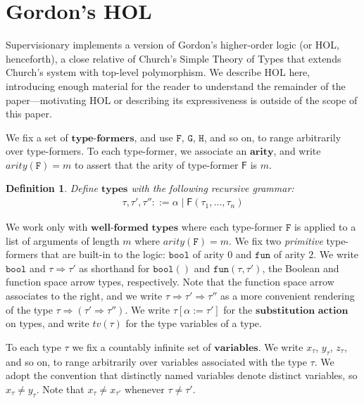 \documentclass[a4paper, 10pt]{article}
\newtheorem{definition}{Definition}[section]
\newcommand{\deffont}[1]{\ensuremath{\textbf{#1}}}
\begin{document}
\section{Gordon's HOL}
\label{sect.gordons.hol}

Supervisionary implements a version of Gordon's higher-order logic (or HOL, henceforth), a close relative of Church's Simple Theory of Types that extends Church's system with top-level polymorphism.
We describe HOL here, introducing enough material for the reader to understand the remainder of the paper---motivating HOL or describing its expressiveness is outside of the scope of this paper.

We fix a set of \deffont{type-formers}, and use $\mathtt{F}$, $\mathtt{G}$, $\mathtt{H}$, and so on, to range arbitrarily over type-formers.
To each type-former, we associate an \deffont{arity}, and write $arity(\mathtt{F}) = m$ to assert that the arity of type-former $\mathsf{F}$ is $m$.

\begin{definition}
\label{defn.types}
Define \deffont{types} with the following recursive grammar:
\begin{gather*}
\tau, \tau', \tau'' ::= \alpha \mid \mathsf{F}(\tau_1, \ldots, \tau_n)
\end{gather*}
\end{definition}

We work only with \deffont{well-formed types} where each type-former $\mathtt{F}$ is applied to a list of arguments of length $m$ where $arity(\mathtt{F}) = m$.
We fix two \emph{primitive} type-formers that are built-in to the logic: $\mathtt{bool}$ of arity $0$ and $\mathtt{fun}$ of arity $2$.
We write $\mathtt{bool}$ and $\tau \Rightarrow \tau'$ as shorthand for $\mathtt{bool}()$ and $\mathtt{fun}(\tau, \tau')$, the Boolean and function space arrow types, respectively.
Note that the function space arrow associates to the right, and we write $\tau \Rightarrow \tau' \Rightarrow \tau''$ as a more convenient rendering of the type $\tau \Rightarrow (\tau' \Rightarrow \tau'')$.
We write $\tau[\alpha := \tau']$ for the \deffont{substitution action} on types, and write $tv(\tau)$ for the type variables of a type.

To each type $\tau$ we fix a countably infinite set of \deffont{variables}.
We write $x_\tau$, $y_\tau$, $z_\tau$, and so on, to range arbitrarily over variables associated with the type $\tau$.
We adopt the convention that distinctly named variables denote distinct variables, so $x_\tau \neq y_\tau$.
Note that $x_\tau \neq x_{\tau'}$ whenever $\tau \neq \tau'$.
\end{document}

